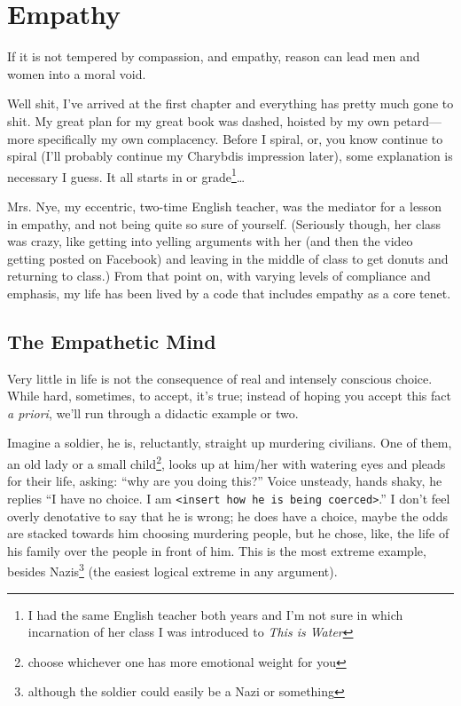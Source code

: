 \documentclass[../butidigress.tex]{subfiles}
\begin{document}
\chapter{Empathy}\label{chap:empathy}
\epigraph{If it is not tempered by compassion, and empathy, reason can lead men and women into a moral void.}{}
\newpage

Well shit, I've arrived at the first chapter and everything has pretty much gone to shit.
My great plan for my great book was dashed, hoisted by my own petard---more specifically my own complacency.
Before I spiral, or, you know continue to spiral (I'll probably continue my Charybdis impression later), some explanation is necessary I guess.
It all starts in  or  grade\footnote{I had the same English teacher both years and I'm not sure in which incarnation of her class I was introduced to \textit{This is Water}}\ldots{}

Mrs. Nye, my eccentric, two-time English teacher, was the mediator for a lesson in empathy, and not being quite so sure of yourself.
(Seriously though, her class was crazy, like getting into yelling arguments with her (and then the video getting posted on Facebook) and leaving in the middle of class to get donuts and returning to class.)
From that point on, with varying levels of compliance and emphasis, my life has been lived by a code that includes empathy as a core tenet.

\section{The Empathetic Mind}
Very little in life is not the consequence of real and intensely conscious choice.
While hard, sometimes, to accept, it's true; instead of hoping you accept this fact \textit{a priori}, we'll run through a didactic example or two.

Imagine a soldier, he is, reluctantly, straight up murdering civilians.
One of them, an old lady or a small child\footnote{choose whichever one has more emotional weight for you}, looks up at him/her with watering eyes and pleads for their life, asking: ``why are you doing this?''
Voice unsteady, hands shaky, he replies ``I have no choice. I am \texttt{<insert how he is being coerced>}.''
I don't feel overly denotative to say that he is wrong; he does have a choice, maybe the odds are stacked towards him choosing murdering people, but he chose, like, the life of his family over the people in front of him.
This is the most extreme example, besides Nazis\footnote{although the soldier could easily be a Nazi or something} (the easiest logical extreme in any argument).
\end{document}
